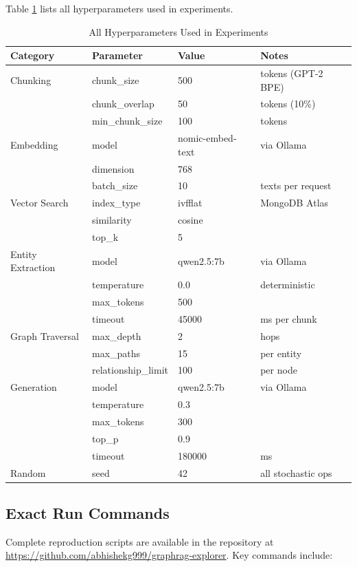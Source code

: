 \documentclass[conference]{IEEEtran}
\begin{document}
Table \ref{tab:hyperparams} lists all hyperparameters used in experiments.

\begin{table}[H]
\caption{All Hyperparameters Used in Experiments}
\label{tab:hyperparams}
\centering
\footnotesize
\begin{tabular}{llll}
\toprule
\textbf{Category} & \textbf{Parameter} & \textbf{Value} & \textbf{Notes} \\
\midrule
Chunking & chunk\_size & 500 & tokens (GPT-2 BPE) \\
 & chunk\_overlap & 50 & tokens (10\%) \\
 & min\_chunk\_size & 100 & tokens \\
Embedding & model & nomic-embed-text & via Ollama \\
 & dimension & 768 & \\
 & batch\_size & 10 & texts per request \\
Vector Search & index\_type & ivfflat & MongoDB Atlas \\
 & similarity & cosine & \\
 & top\_k & 5 & \\
Entity Extraction & model & qwen2.5:7b & via Ollama \\
 & temperature & 0.0 & deterministic \\
 & max\_tokens & 500 & \\
 & timeout & 45000 & ms per chunk \\
Graph Traversal & max\_depth & 2 & hops \\
 & max\_paths & 15 & per entity \\
 & relationship\_limit & 100 & per node \\
Generation & model & qwen2.5:7b & via Ollama \\
 & temperature & 0.3 & \\
 & max\_tokens & 300 & \\
 & top\_p & 0.9 & \\
 & timeout & 180000 & ms \\
Random & seed & 42 & all stochastic ops \\
\bottomrule
\end{tabular}
\end{table}

\subsection{Exact Run Commands}

Complete reproduction scripts are available in the repository at \url{https://github.com/abhishekg999/graphrag-explorer}. Key commands include:
\end{document}
